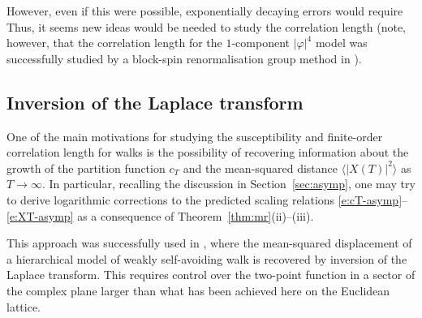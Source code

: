 However, even if this were possible, exponentially decaying errors would require
Thus, it seems new ideas would be needed to study the correlation length (note,
however, that the correlation length for the $1$-component $|\varphi|^4$ model
was successfully studied by a block-spin renormalisation group method in \cite{HT87}).


\subsection{Inversion of the Laplace transform}

One of the main motivations for studying the
susceptibility and finite-order correlation length for walks is the possibility
of recovering information about the growth of the partition function $c_T$ and
the mean-squared distance $\langle |X(T)|^2 \rangle$ as $T\to\infty$. In
particular, recalling the discussion in Section~\ref{sec:asymp}, one may
try to derive logarithmic corrections to the predicted scaling relations
\eqref{e:cT-asymp}--\eqref{e:XT-asymp} as a consequence of Theorem~\ref{thm:mr}(ii)--(iii).

This approach was successfully used in \cite{BI03c}, where the mean-squared displacement
of a hierarchical model of weakly self-avoiding walk is recovered by inversion of
the Laplace transform. This requires control over the two-point function in a
sector of the complex plane larger than what has been achieved here on the
Euclidean lattice.

